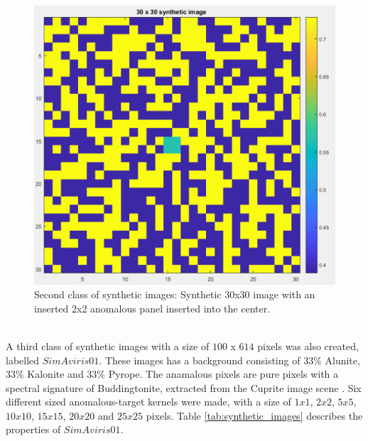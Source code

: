 \begin{figure}[H]
\centering
   \includegraphics[scale=0.4]{images/AD_testing/synthetic_images/30_30_anomaly_image.PNG}
  \caption{Second class of synthetic images: Synthetic 30x30 image with an inserted 2x2 anomalous panel inserted into the center.} 
  \label{fig:synthetic_30_30}
\end{figure}


\\
A third class of synthetic images with a size of $100$ x $614$ pixels was also created, labelled $SimAviris01$. These images has a background consisting of $33\%$ Alunite, $33\%$ Kalonite and $33\%$ Pyrope. The anamalous pixels are pure pixels with a spectral signature of Buddingtonite, extracted from the Cuprite image scene \cite{ground_truth_cuprite}. Six different sized anomalous-target kernels were made, with a size of $1x1$, $2x2$, $5x5$, $10x10$, $15x15$, $20x20$ and $25x25$ pixels. Table \ref{tab:synthetic_images} describes the properties of $SimAviris01$.




